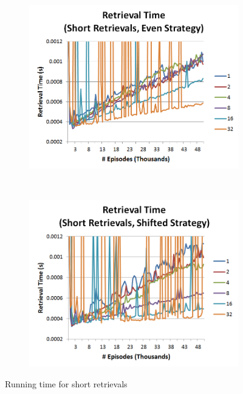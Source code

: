 \documentclass[11pt]{article} %
\begin{document}
\begin{figure}
        \centering
        \begin{subfigure}[b]{0.55\textwidth}
                \centering
                \includegraphics[width=\textwidth]{images/ret_short_eq}
                \label{fig:retseq}
        \end{subfigure}%
        ~ %
        \begin{subfigure}[b]{0.55\textwidth}
                \centering
                \includegraphics[width=\textwidth]{images/ret_short_shift}
                \label{fig:retsshift}
        \end{subfigure}
        \caption{Running time for short retrievals}
	\label{fig:short}
\end{figure}
\end{document}
